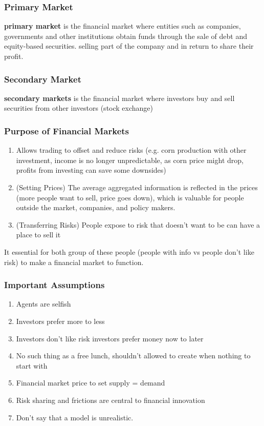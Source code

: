 \begin{multicols}{2}
\subsubsection{Primary Market}
\textbf{primary market} is the financial market where entities such as companies, governments and other institutions obtain funds through the sale of debt and equity-based securities. selling part of the company and in return to share their profit.

\subsubsection{Secondary Market}

\textbf{secondary markets} is the financial market where investors buy and sell securities from other investors (stock exchange)

\subsubsection{Purpose of Financial Markets}

\par
\begin{enumerate}
    \item Allows trading to offset and reduce risks (e.g. corn production with other investment, income is no longer unpredictable, as corn price might drop, profits from investing can save some downsides)
    \item (Setting Prices) The average aggregated information is reflected in the prices (more people want to sell, price goes down), which is valuable for people outside the market, companies, and policy makers. 
    \item (Transferring Risks) People expose to risk that doesn't want to be can have a place to sell it
\end{enumerate}
It essential for both group of these people (people with info vs people don't like risk) to make a financial market to function. 

\subsubsection{Important Assumptions}
\begin{enumerate}
    \item Agents are selfish
    \item Investors prefer more to less
    \item Investors don't like risk
    investors prefer money now to later
    \item No such thing as a free lunch, shouldn't allowed to create when nothing to start with 
    \item Financial market price to set supply = demand
    \item Risk sharing and frictions are central to financial innovation
    \item Don't say that a model is unrealistic. 
\end{enumerate}

\end{multicols}
